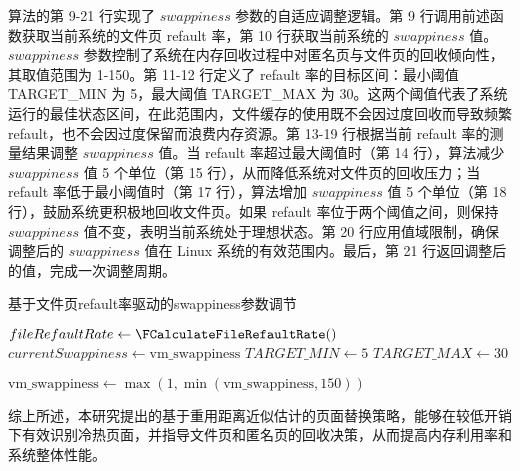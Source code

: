 算法的第 9-21 行实现了 \(swappiness\) 参数的自适应调整逻辑。第 9 行调用前述函数获取当前系统的文件页 refault 率，第 10 行获取当前系统的 \(swappiness\) 值。\(swappiness\) 参数控制了系统在内存回收过程中对匿名页与文件页的回收倾向性，其取值范围为 1-150。第 11-12 行定义了 refault 率的目标区间：最小阈值 TARGET\_MIN 为 5，最大阈值 TARGET\_MAX 为 30。这两个阈值代表了系统运行的最佳状态区间，在此范围内，文件缓存的使用既不会因过度回收而导致频繁 refault，也不会因过度保留而浪费内存资源。第 13-19 行根据当前 refault 率的测量结果调整 \(swappiness\) 值。当 refault 率超过最大阈值时（第 14 行），算法减少 \(swappiness\) 值 5 个单位（第 15 行），从而降低系统对文件页的回收压力；当 refault 率低于最小阈值时（第 17 行），算法增加 \(swappiness\) 值 5 个单位（第 18 行），鼓励系统更积极地回收文件页。如果 refault 率位于两个阈值之间，则保持 \(swappiness\) 值不变，表明当前系统处于理想状态。第 20 行应用值域限制，确保调整后的 \(swappiness\) 值在 Linux 系统的有效范围内。最后，第 21 行返回调整后的值，完成一次调整周期。
\begin{algorithm}[H]
  \caption{基于文件页refault率驱动的swappiness参数调节}
  \label{alg:swappiness1}
  
  
  \(fileRefaultRate \gets \FCalculateFileRefaultRate()\) \;
  \(currentSwappiness \gets \text{vm\_swappiness}\) \;  %
  \(TARGET\_MIN \gets 5\) \;
  \(TARGET\_MAX \gets 30\) \;

  \(\text{vm\_swappiness} \gets \max(1, \min(\text{vm\_swappiness}, 150))\) \;
\end{algorithm}

综上所述，本研究提出的基于重用距离近似估计的页面替换策略，能够在较低开销下有效识别冷热页面，并指导文件页和匿名页的回收决策，从而提高内存利用率和系统整体性能。

